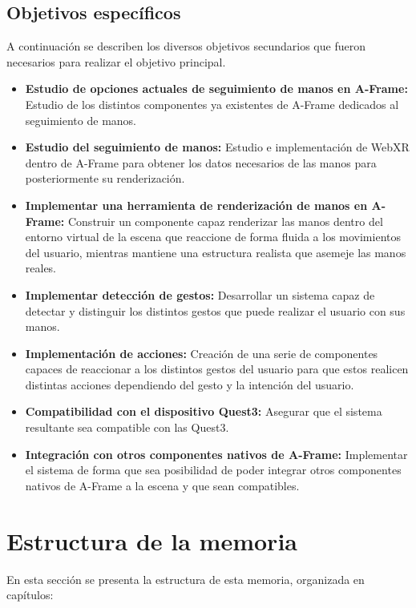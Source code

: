 \documentclass[a4paper, 12pt]{book}
\begin{document}
\subsection{Objetivos específicos}
\label{subsec:objetivos-especificos}
A continuación se describen los diversos objetivos secundarios que fueron necesarios para realizar el objetivo principal.
\begin{itemize}
  \item \textbf{Estudio de opciones actuales de seguimiento de manos en A-Frame:} Estudio de los distintos componentes ya existentes de A-Frame dedicados al seguimiento de manos.
  \item \textbf{Estudio del seguimiento de manos:} Estudio e implementación de WebXR dentro de A-Frame para obtener los datos necesarios de las manos para posteriormente su renderización.
  \item \textbf{Implementar una herramienta de renderización de manos en A-Frame:} Construir un componente capaz renderizar las manos dentro del entorno virtual de la escena que reaccione de forma fluida a los movimientos del usuario, mientras mantiene una estructura realista que asemeje las manos reales. 
  \item \textbf{Implementar detección de gestos:} Desarrollar un sistema capaz de detectar y distinguir los distintos gestos que puede realizar el usuario con sus manos.
  \item \textbf{Implementación de acciones:} Creación de una serie de componentes capaces de reaccionar a los distintos gestos del usuario para que estos realicen distintas acciones dependiendo del gesto y la intención del usuario. 
  \item \textbf{Compatibilidad con el dispositivo Quest3:} Asegurar que el sistema resultante sea compatible con las Quest3.
  \item \textbf{Integración con otros componentes nativos de A-Frame:} Implementar el sistema de forma que sea posibilidad de poder integrar otros componentes nativos de A-Frame a la escena y que sean compatibles.
\end{itemize}

\section{Estructura de la memoria}
\label{subsec:estructura}
En esta sección se presenta la estructura de esta memoria, organizada en capítulos:
\end{document}
